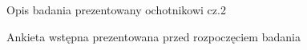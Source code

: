 \documentclass{./assets/wfis}
\begin{document}
\begin{figure}[h!]
    \centering
    \caption{Opis badania prezentowany ochotnikowi cz.2}
    \label{zgoda-na-przetwarzanie-danych}
\end{figure}


\begin{figure}[h!]
    \centering
    \caption{Ankieta wstępna prezentowana przed rozpoczęciem badania}
    \label{pytania-ankiety-wejsciowej}
\end{figure}
\end{document}
